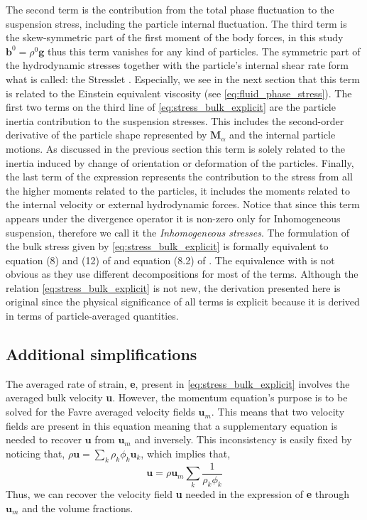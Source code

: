 The second term is the  contribution from the total phase fluctuation to the suspension stress, including the particle internal fluctuation. 
The third term is the skew-symmetric part of the first moment of the body forces, in this study $\textbf{b}^0 = \rho^0 \textbf{g}$ thus this term vanishes for any kind of particles. 
The symmetric part of the hydrodynamic stresses together with the particle's internal shear rate form what is called: the Stresslet \citep{pozrikidis1992boundary}. 
Especially, we see in the next section that this term is related to the Einstein equivalent viscosity (see \ref{eq:fluid_phase_stress}). 
The first two terms on the third line of \ref{eq:stress_bulk_explicit} are the particle inertia contribution to the suspension stresses. 
This includes the second-order derivative of the particle shape represented by $\textbf{M}_\alpha$ and the internal particle motions. 
As discussed in the previous section this term is solely related to the inertia induced by change of orientation or deformation of the particles. 
Finally, the last term of the expression represents the contribution to the stress from all the higher moments related to the particles, it includes the moments related to the internal velocity or external hydrodynamic forces.  
Notice that since this term appears under the divergence operator it is non-zero only for Inhomogeneous suspension, therefore we call it the \textit{Inhomogeneous stresses}. 
The formulation of the bulk stress given by \ref{eq:stress_bulk_explicit} is formally equivalent to equation (8) and (12) of \citet{lhuillier1996contribution} and equation (8.2) of \citet{zhang1997momentum}.
The equivalence with \citet{zhang1997momentum} is not obvious as they use different decompositions for most of the terms. 
Although the relation \ref{eq:stress_bulk_explicit} is not new, the derivation presented here is original since the physical significance of all terms is explicit because it is derived in terms of particle-averaged quantities.

    
\subsection{Additional simplifications}

The averaged rate of strain, \textbf{e}, present in \ref{eq:stress_bulk_explicit} involves the averaged bulk velocity \textbf{u}. 
However, the momentum equation's purpose is to be solved for the Favre averaged velocity fields $\textbf{u}_m$. 
This means that two velocity fields are present in this equation meaning that a supplementary equation is needed to recover $\textbf{u}$ from $\textbf{u}_m$ and inversely. 
This inconsistency is easily fixed by noticing that, $\rho \textbf{u} = \sum_k \rho_k \phi_k \textbf{u}_k$, which implies that, 
\begin{equation}
    \textbf{u}=\rho \textbf{u}_m\sum_k \frac{1}{\rho_k \phi_k}
\end{equation}
Thus, we can recover the velocity field \textbf{u} needed in the expression of \textbf{e} through $\textbf{u}_m$ and the volume fractions. 


